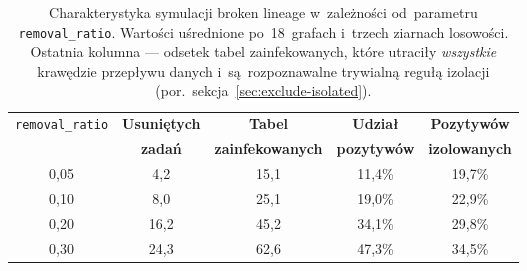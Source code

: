 \begin{table}[ht]
\centering
\caption{Charakterystyka symulacji broken lineage w~zależności od~parametru \texttt{removal\_ratio}. Wartości uśrednione po~18~grafach i~trzech ziarnach losowości. Ostatnia kolumna — odsetek tabel zainfekowanych, które utraciły \emph{wszystkie} krawędzie przepływu danych i~są~rozpoznawalne trywialną regułą izolacji (por.~sekcja~\ref{sec:exclude-isolated}).}
\label{tab:symulacja}
\begin{tabular}{ccccc}
\toprule
\texttt{removal\_ratio} & \textbf{Usuniętych} & \textbf{Tabel} & \textbf{Udział} & \textbf{Pozytywów} \\
 & \textbf{zadań} & \textbf{zainfekowanych} & \textbf{pozytywów} & \textbf{izolowanych} \\
\midrule
0{,}05 & 4{,}2 & 15{,}1 & 11{,}4\% & 19{,}7\% \\
0{,}10 & 8{,}0 & 25{,}1 & 19{,}0\% & 22{,}9\% \\
0{,}20 & 16{,}2 & 45{,}2 & 34{,}1\% & 29{,}8\% \\
0{,}30 & 24{,}3 & 62{,}6 & 47{,}3\% & 34{,}5\% \\
\bottomrule
\end{tabular}
\end{table}